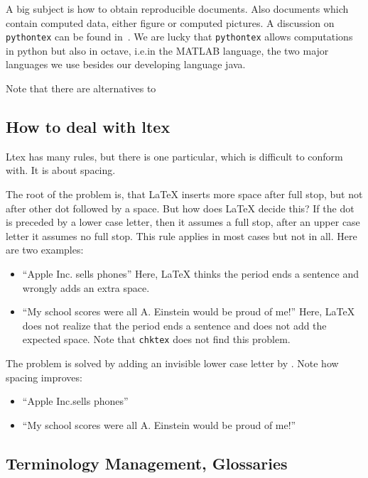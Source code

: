 \documentclass[a4paper,12pt]{article}
\begin{document}
A big subject is how to obtain reproducible documents. 
Also documents which contain computed data, either figure or computed pictures. 
A discussion on \texttt{pythontex} can be found in~\cite{Poo15}. 
We are lucky that \texttt{pythontex} allows computations in python but also in octave, 
i.e.\@ in the MATLAB language,  
the two major languages we use besides our developing language java. 

Note that there are alternatives to 


\subsection{How to deal with ltex}\label{subsec:ltex}

Ltex has many rules, but there is one particular, which is difficult to conform with. 
It is about spacing. 

The root of the problem is, that \LaTeX{} inserts more space after full stop, 
but not after other dot followed by a space. 
But how does \LaTeX{} decide this? If the dot is preceded by a lower case letter, 
then it assumes a full stop, after an upper case letter it assumes no full stop. 
This rule applies in most cases but not in all. 
Here are two examples: 
%
\begin{itemize}
  \item ``Apple Inc. sells phones''%
  Here, \LaTeX{} thinks the period ends a sentence and wrongly adds an extra space.
  \item ``My school scores were all A. Einstein would be proud of me!''
  Here, \LaTeX{} does not realize that the period ends a sentence 
  and does not add the expected space. 
  Note that \texttt{chktex} does not find this problem. 
\end{itemize}

The problem is solved by adding an invisible lower case letter by \texttt{\textbackslash@}. 
Note how spacing improves: 
\begin{itemize}
  \item ``Apple Inc.\@ sells phones''
  \item ``My school scores were all A\@. Einstein would be proud of me!''
\end{itemize}

\subsection{Terminology Management, Glossaries}\label{subsec:glos}
\end{document}
